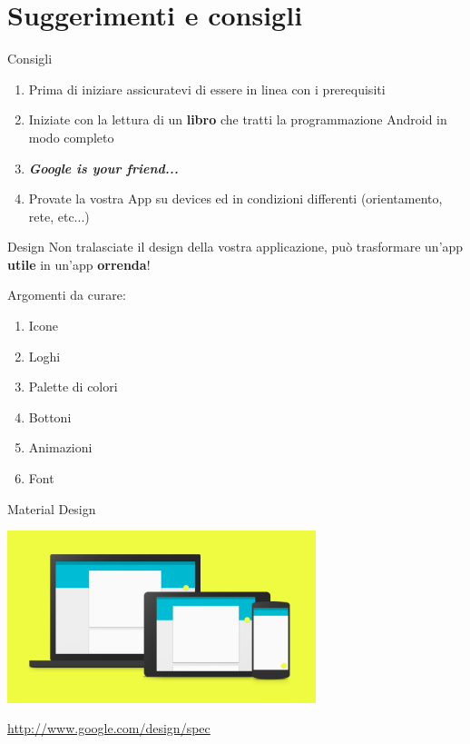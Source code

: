 \documentclass[xcolor=svgnames,11pt]{beamer}
\begin{document}
\section{Suggerimenti e consigli}

\begin{frame}{Consigli}
\pause
\begin{enumerate}
\item Prima di iniziare assicuratevi di essere in linea con i prerequisiti
\pause
\item Iniziate con la lettura di un \textbf{libro} che tratti la programmazione Android in modo completo
\pause
\item \textbf{\emph{Google is your friend...}}
\pause
\item Provate la vostra App su devices ed in condizioni differenti (orientamento, rete, etc...)
\end{enumerate}
\end{frame}

\begin{frame}{Design}
Non tralasciate il design della vostra applicazione, pu\`o trasformare un'app \textbf{utile} in un'app \textbf{orrenda}!

\pause
\medskip

Argomenti da curare:
\pause
\begin{enumerate}
\item Icone
\pause
\item Loghi
\pause
\item Palette di colori
\pause
\item Bottoni
\pause
\item Animazioni
\pause
\item Font
\end{enumerate}

\end{frame}

\begin{frame}{Material Design}

\begin{center}

\includegraphics[width=9cm]{material.png}

\bigskip

\url{http://www.google.com/design/spec}

\end{center}

\end{frame}
\end{document}

